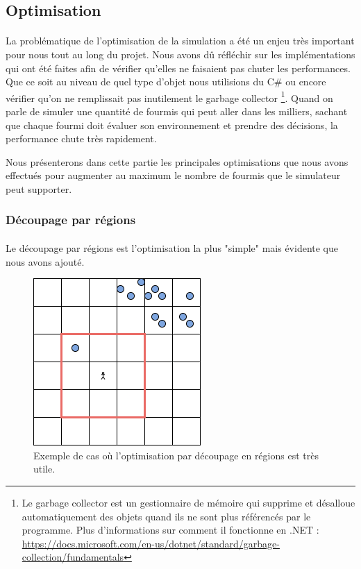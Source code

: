 \documentclass{EPUProjetDi}
\begin{document}
\subsection{Optimisation}

\paragraph{}
La problématique de l'optimisation de la simulation a été un enjeu très important pour nous tout au long du projet. Nous avons dû réfléchir sur les implémentations qui ont été faites afin de vérifier qu'elles ne 
faisaient pas chuter les performances. Que ce soit au niveau de quel type d'objet nous utilisions du C\# ou encore vérifier qu'on ne remplissait pas inutilement le garbage collector 
\footnote{Le garbage collector est un gestionnaire de mémoire qui supprime et désalloue automatiquement des objets quand ils ne sont plus référencés par le programme. 
Plus d'informations sur comment il fonctionne en .NET : \url{https://docs.microsoft.com/en-us/dotnet/standard/garbage-collection/fundamentals}}.
Quand on parle de simuler une quantité de fourmis qui peut aller dans les milliers, sachant que chaque fourmi doit évaluer son environnement et prendre des décisions, la performance chute très rapidement.

Nous présenterons dans cette partie les principales optimisations que nous avons effectués pour augmenter au maximum le nombre de fourmis que le simulateur peut supporter.

\subsubsection{Découpage par régions}
\paragraph{}
Le découpage par régions est l'optimisation la plus "simple" mais évidente que nous avons ajouté.

\begin{figure}[h]
    \centering
    \includegraphics[scale=1]{decoupage_region.png}
    \caption{Exemple de cas où l'optimisation par découpage en régions est très utile.}
    \label{fig:decoupage_region}
\end{figure}
\end{document}
